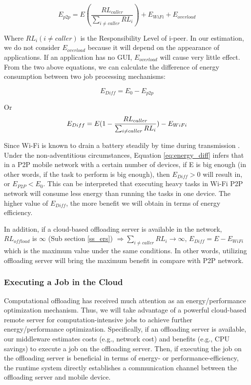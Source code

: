 \documentclass{sig-alternate}
\begin{document}
\begin{small} $$E_{p2p} = E(\frac{RL_{caller}}{\sum_{i \neq caller}{RL_{i}}}) + E_{WiFi} + E_{overload}$$  \end{small}

Where $RL_{i} (i \neq caller)$ is the Responsibility Level of i-peer. In our estimation, we do not consider $E_{overload}$ because it will depend on the appearance of applications. If an application has no GUI, $E_{overload}$ will cause very little effect. From the two above equations, we can calculate the difference of energy consumption between two job processing mechanisms:

\begin{small} $$E_{Diff} = E_{0} - E_{p2p}$$ \end{small} Or 
\begin{equation}
\label{eq:energy_diff} \small
E_{Diff} = E(1 - \frac{RL_{caller}}{\sum_{i \neq caller}{RL_{i}}}) - E_{WiFi}
\end{equation}

Since Wi-Fi is known to drain a battery steadily by time during transmission \cite{wifi_energy}. Under the non-adventitious circumstances, Equation \ref{eq:energy_diff} infers that in a P2P mobile network with a certain number of devices, if E is big enough (in other words, if the task to perform is big enough), then $E_{Diff} > 0$ will result in, or $E_{P2P} < E_{0}$. This can be interpreted that executing heavy tasks in Wi-Fi P2P network will consume less energy than running the tasks in one device. The higher value of $E_{Diff}$, the more benefit we will obtain in terms of energy efficiency.

In addition, if a cloud-based offloading server is available in the network, $RL_{offload}$ is $\infty$ (Sub section \ref{ss_ers}) $\Rightarrow \sum_{i \neq caller}{RL_{i}} \rightarrow \infty$, $E_{Diff} = E - E_{WiFi}$ which is the maximum value under the same conditions. In other words, utilizing offloading server will bring the maximum benefit in compare with P2P network.

\subsubsection{Executing a Job in the Cloud}
Computational offloading \cite{kwon+:icsm13} has received much attention as an energy/performance optimization mechanism. Thus, we will take advantage of a powerful cloud-based remote server for computation-intensive jobs to achieve further energy/performance optimization. Specifically, if an offloading server is available, our middleware estimates costs (e.g., network cost) and benefits (e.g., CPU savings) to execute a job on the offloading server. Then, if executing the job on the offloading server is beneficial in terms of energy- or performance-efficiency, the runtime system directly establishes a communication channel between the offloading server and mobile device.
\end{document}
